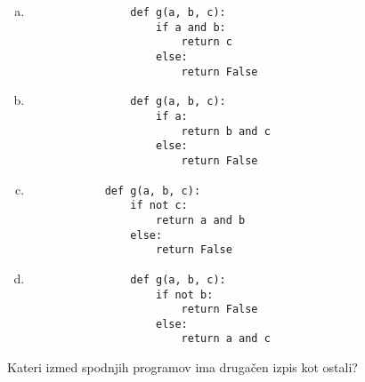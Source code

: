\documentclass[arhiv, 10pt]{../izpit}
\begin{document}
        \begin{multicols}{2}
        \begin{enumerate}[(a)]
\item 
                \begin{verbatim}
                def g(a, b, c):
                    if a and b:
                        return c
                    else:
                        return False
                \end{verbatim}
            
\item 
                \begin{verbatim}
                def g(a, b, c):
                    if a:
                        return b and c
                    else:
                        return False
                \end{verbatim}
            
\item 
            \begin{verbatim}
            def g(a, b, c):
                if not c:
                    return a and b
                else:
                    return False
            \end{verbatim}
        
\item 
                \begin{verbatim}
                def g(a, b, c):
                    if not b:
                        return False
                    else:
                        return a and c
                \end{verbatim}
            
\end{enumerate}

        \end{multicols}
    
        \naloga*
        
        Kateri izmed spodnjih programov ima drugačen izpis kot ostali?
    
\end{document}
